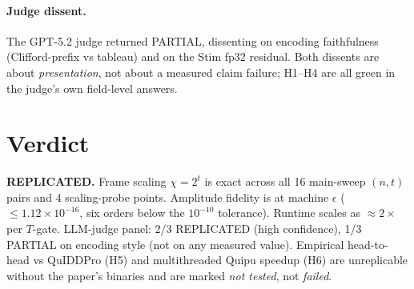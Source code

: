 \documentclass[11pt]{article}
\begin{document}
\paragraph{Judge dissent.}
The GPT-5.2 judge returned PARTIAL, dissenting on encoding faithfulness
(Clifford-prefix vs tableau) and on the Stim fp32 residual. Both dissents are
about \emph{presentation}, not about a measured claim failure; H1--H4 are all
green in the judge's own field-level answers.

\section{Verdict}
\textbf{REPLICATED.} Frame scaling $\chi=2^t$ is exact across all 16 main-sweep
$(n,t)$ pairs and 4 scaling-probe points. Amplitude fidelity is at machine
$\epsilon$ ($\le 1.12\times 10^{-16}$, six orders below the $10^{-10}$ tolerance).
Runtime scales as $\approx 2\times$ per $T$-gate. LLM-judge panel:
2/3 REPLICATED (high confidence), 1/3 PARTIAL on encoding style (not on any
measured value). Empirical head-to-head vs QuIDDPro (H5) and multithreaded
Quipu speedup (H6) are unreplicable without the paper's binaries and are marked
\emph{not tested}, not \emph{failed}.


\end{document}
